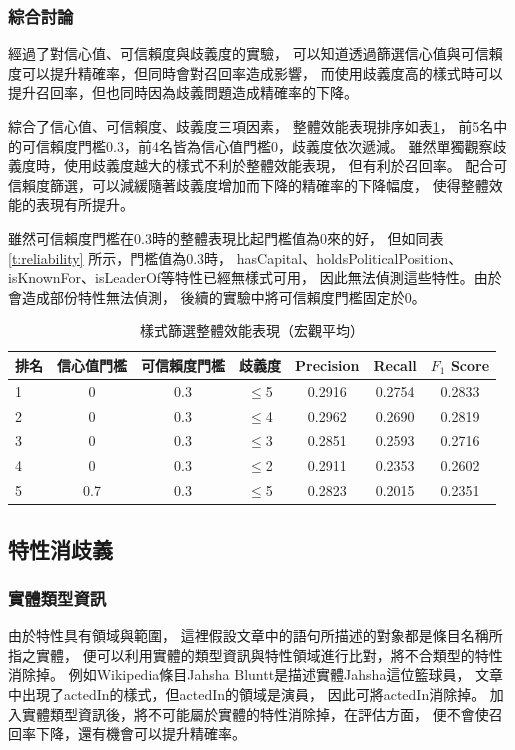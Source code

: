 \subsubsection{綜合討論}
經過了對信心值、可信賴度與歧義度的實驗，
可以知道透過篩選信心值與可信賴度可以提升精確率，但同時會對召回率造成影響，
而使用歧義度高的樣式時可以提升召回率，但也同時因為歧義問題造成精確率的下降。

綜合了信心值、可信賴度、歧義度三項因素，
整體效能表現排序如表\ref{t:ptn-select-overall}，
前5名中的可信賴度門檻0.3，前4名皆為信心值門檻0，歧義度依次遞減。
雖然單獨觀察歧義度時，使用歧義度越大的樣式不利於整體效能表現，
但有利於召回率。
配合可信賴度篩選，可以減緩隨著歧義度增加而下降的精確率的下降幅度，
使得整體效能的表現有所提升。

雖然可信賴度門檻在0.3時的整體表現比起門檻值為0來的好，
但如同表\ref{t:reliability} 所示，門檻值為0.3時，
hasCapital、holdsPoliticalPosition、isKnownFor、isLeaderOf等特性已經無樣式可用，
因此無法偵測這些特性。由於會造成部份特性無法偵測，
後續的實驗中將可信賴度門檻固定於0。

\begin{table}[h]
    \caption{樣式篩選整體效能表現（宏觀平均）}
    \label{t:ptn-select-overall}
    \footnotesize
    \begin{center}
        \begin{tabular}{|l||c|c|c||c|c|c|}
            \hline
            排名 & 信心值門檻 & 可信賴度門檻 & 歧義度 & Precision & Recall & $F_1$ Score \\
            \hline
            1 & 0 & 0.3 & $\leq$5 & 0.2916 & 0.2754 & 0.2833 \\
            2 & 0 & 0.3 & $\leq$4 & 0.2962 & 0.2690 & 0.2819 \\
            3 & 0 & 0.3 & $\leq$3 & 0.2851 & 0.2593 & 0.2716 \\
            4 & 0 & 0.3 & $\leq$2 & 0.2911 & 0.2353 & 0.2602 \\
            5 & 0.7 & 0.3&$\leq$5 & 0.2823 & 0.2015 & 0.2351 \\
            \hline
        \end{tabular}
    \end{center}
\end{table}

\subsection{特性消歧義}
\subsubsection{實體類型資訊}
由於特性具有領域與範圍，
這裡假設文章中的語句所描述的對象都是條目名稱所指之實體，
便可以利用實體的類型資訊與特性領域進行比對，將不合類型的特性消除掉。
例如Wikipedia條目Jahsha Bluntt是描述實體Jahsha這位籃球員，
文章中出現了actedIn的樣式，但actedIn的領域是演員，
因此可將actedIn消除掉。
加入實體類型資訊後，將不可能屬於實體的特性消除掉，在評估方面，
便不會使召回率下降，還有機會可以提升精確率。


